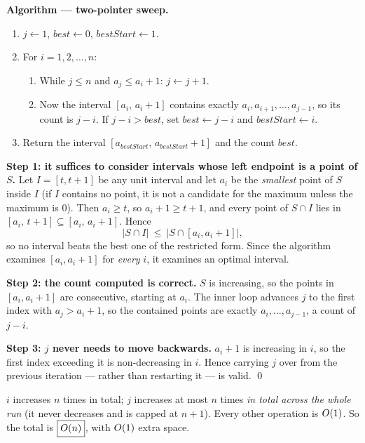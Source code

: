 \textbf{Algorithm --- two-pointer sweep.}
\begin{enumerate}
  \item $j\leftarrow1$, $\mathit{best}\leftarrow0$, $\mathit{bestStart}\leftarrow1$.
  \item For $i=1,2,\dots,n$:
        \begin{enumerate}
          \item While $j\le n$ and $a_j\le a_i+1$: $j\leftarrow j+1$.
          \item Now the interval $[a_i,\,a_i+1]$ contains exactly $a_i,a_{i+1},\dots,a_{j-1}$, so
                its count is $j-i$. If $j-i>\mathit{best}$, set $\mathit{best}\leftarrow j-i$ and
                $\mathit{bestStart}\leftarrow i$.
        \end{enumerate}
  \item Return the interval $[a_{\mathit{bestStart}},\,a_{\mathit{bestStart}}+1]$ and the count
        $\mathit{best}$.
\end{enumerate}

\begin{correct}
\textbf{Step 1: it suffices to consider intervals whose left endpoint is a point of $S$.}
Let $I=[t,t+1]$ be any unit interval and let $a_i$ be the \emph{smallest} point of $S$ inside
$I$ (if $I$ contains no point, it is not a candidate for the maximum unless the maximum is $0$).
Then $a_i\ge t$, so $a_i+1\ge t+1$, and every point of $S\cap I$ lies in $[a_i,\,t+1]\subseteq
[a_i,\,a_i+1]$. Hence
\[
  |S\cap I|\ \le\ \bigl|S\cap[a_i,a_i+1]\bigr| ,
\]
so no interval beats the best one of the restricted form. Since the algorithm examines
$[a_i,a_i+1]$ for \emph{every} $i$, it examines an optimal interval.

\textbf{Step 2: the count computed is correct.} $S$ is increasing, so the points in
$[a_i,a_i+1]$ are consecutive, starting at $a_i$. The inner loop advances $j$ to the first index
with $a_j>a_i+1$, so the contained points are exactly $a_i,\dots,a_{j-1}$, a count of $j-i$.

\textbf{Step 3: $j$ never needs to move backwards.} $a_i+1$ is increasing in $i$, so the first
index exceeding it is non-decreasing in $i$. Hence carrying $j$ over from the previous iteration
--- rather than restarting it --- is valid. \qed
\end{correct}

\begin{cplx}
$i$ increases $n$ times in total; $j$ increases at most $n$ times \emph{in total across the whole
run} (it never decreases and is capped at $n+1$). Every other operation is $O(1)$. So the total
is $\boxed{O(n)}$, with $O(1)$ extra space.
\end{cplx}

